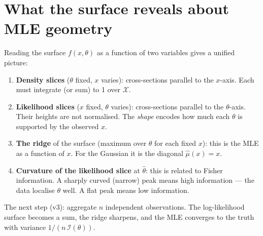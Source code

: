 \documentclass[12pt, a4paper]{article}
\theoremstyle{definition}
\theoremstyle{remark}
\begin{document}
\section{What the surface reveals about MLE geometry}

Reading the surface $f(x,\theta)$ as a function of two variables
gives a unified picture:

\begin{enumerate}
  \item \textbf{Density slices} ($\theta$ fixed, $x$ varies):
    cross-sections parallel to the $x$-axis.
    Each must integrate (or sum) to 1 over $\mathcal{X}$.

  \item \textbf{Likelihood slices} ($x$ fixed, $\theta$ varies):
    cross-sections parallel to the $\theta$-axis.
    Their heights are not normalised.
    The \emph{shape} encodes how much each $\theta$ is
    supported by the observed $x$.

  \item \textbf{The ridge} of the surface (maximum over $\theta$
    for each fixed $x$): this is the MLE as a function of $x$.
    For the Gaussian it is the diagonal $\hat\mu(x) = x$.

  \item \textbf{Curvature of the likelihood slice} at $\hat\theta$:
    this is related to Fisher information.
    A sharply curved (narrow) peak means high information ---
    the data localise $\theta$ well.
    A flat peak means low information.
\end{enumerate}

\bigskip
\noindent
The next step (v3): aggregate $n$ independent observations.
The log-likelihood surface becomes a sum, the ridge sharpens,
and the MLE converges to the truth with variance
$1/(n\,\mathcal{I}(\theta))$.
\end{document}
